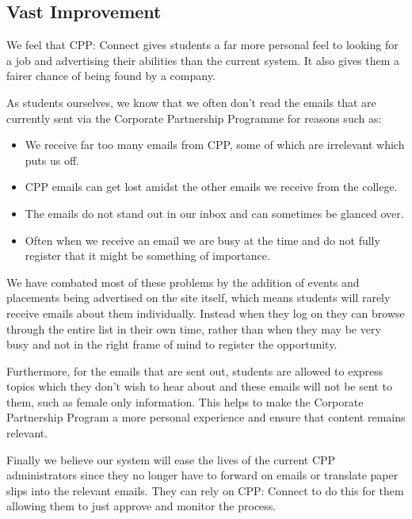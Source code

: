 \subsection{Vast Improvement}
We feel that CPP: Connect gives students a far more personal feel to looking for a job and advertising their abilities than the current system. It also gives them a fairer chance of being found by a company.

As students ourselves, we know that we often don't read the emails that are currently sent via the Corporate Partnership Programme for reasons such as:
\begin{itemize}
  \item We receive far too many emails from CPP, some of which are irrelevant which puts us off.
  \item CPP emails can get lost amidst the other emails we receive from the college.
  \item The emails do not stand out in our inbox and can sometimes be glanced over.
  \item Often when we receive an email we are busy at the time and do not fully register that it might be something of importance.
\end{itemize} 

We have combated most of these problems by the addition of events and placements being advertised on the site itself, which means students will rarely receive emails about them individually. Instead when they log on they can browse through the entire list in their own time, rather than when they may be very busy and not in the right frame of mind to register the opportunity.

Furthermore, for the emails that are sent out, students are allowed to express topics which they don't wish to hear about and these emails will not be sent to them, such as female only information. This helps to make the Corporate Partnership Program a more personal experience and ensure that content remains relevant.

Finally we believe our system will ease the lives of the current CPP administrators since they no longer have to forward on emails or translate paper slips into the relevant emails. They can rely on CPP: Connect to do this for them allowing them to just approve and monitor the process.